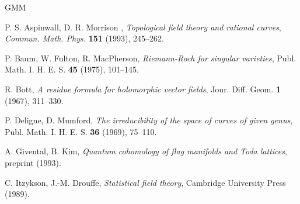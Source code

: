 \documentclass{amsart}
\begin{document}
\begin{thebibliography}{GMM}
  




P. S. Aspinwall, D. R. Morrison ,
\textit{Topological field theory and rational curves},
\textit{Commun. Math. Phys.} \textbf{151} (1993), 245--262.



P. Baum, W. Fulton, R. MacPherson,
\textit{Riemann-Roch for singular varieties},
{Publ. Math. I. H. E. S.} \textbf{45} (1975), 101--145.



R. Bott,
\textit{A residue formula for holomorphic vector fields},
{Jour. Diff. Geom.} \textbf{1} (1967), 311--330.



P. Deligne, D. Mumford,
\textit{The irreducibility of the space of curves of given genus},
{Publ. Math. I. H. E. S.} \textbf{36} (1969), 75--110.


A. Givental, B. Kim,
\textit{Quantum cohomology of flag manifolds and Toda lattices},
preprint (1993).


C. Itzykson, J.-M. Drouffe,
\textit{Statistical field theory},
Cambridge University Press (1989).




\end{thebibliography}
\end{document}
